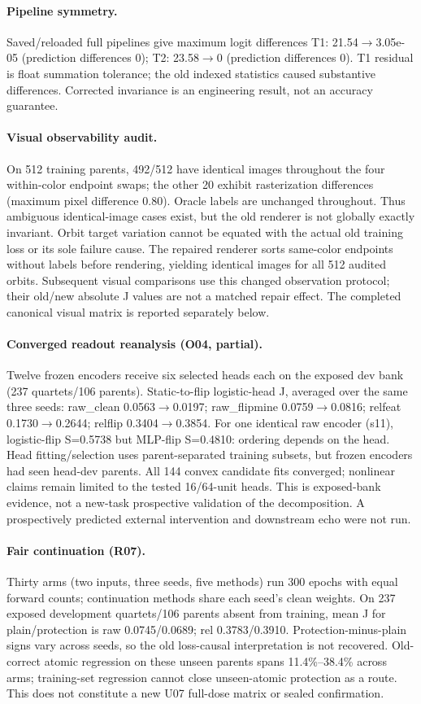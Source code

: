 \paragraph{Pipeline symmetry.} Saved/reloaded full pipelines give maximum logit differences T1: 21.54$\to$3.05e-05 (prediction differences 0); T2: 23.58$\to$0 (prediction differences 0). T1 residual is float summation tolerance; the old indexed statistics caused substantive differences. Corrected invariance is an engineering result, not an accuracy guarantee.
\paragraph{Visual observability audit.} On 512 training parents, 492/512 have identical images throughout the four within-color endpoint swaps; the other 20 exhibit rasterization differences (maximum pixel difference 0.80). Oracle labels are unchanged throughout. Thus ambiguous identical-image cases exist, but the old renderer is not globally exactly invariant. Orbit target variation cannot be equated with the actual old training loss or its sole failure cause. The repaired renderer sorts same-color endpoints without labels before rendering, yielding identical images for all 512 audited orbits. Subsequent visual comparisons use this changed observation protocol; their old/new absolute J values are not a matched repair effect. The completed canonical visual matrix is reported separately below.
\paragraph{Converged readout reanalysis (O04, partial).} Twelve frozen encoders receive six selected heads each on the exposed dev bank (237 quartets/106 parents). Static-to-flip logistic-head J, averaged over the same three seeds: raw\_clean 0.0563$\to$0.0197; raw\_flipmine 0.0759$\to$0.0816; relfeat 0.1730$\to$0.2644; relflip 0.3404$\to$0.3854. For one identical raw encoder (s11), logistic-flip S=0.5738 but MLP-flip S=0.4810: ordering depends on the head. Head fitting/selection uses parent-separated training subsets, but frozen encoders had seen head-dev parents. All 144 convex candidate fits converged; nonlinear claims remain limited to the tested 16/64-unit heads. This is exposed-bank evidence, not a new-task prospective validation of the decomposition. A prospectively predicted external intervention and downstream echo were not run.
\paragraph{Fair continuation (R07).} Thirty arms (two inputs, three seeds, five methods) run 300 epochs with equal forward counts; continuation methods share each seed's clean weights. On 237 exposed development quartets/106 parents absent from training, mean J for plain/protection is raw 0.0745/0.0689; rel 0.3783/0.3910. Protection-minus-plain signs vary across seeds, so the old loss-causal interpretation is not recovered. Old-correct atomic regression on these unseen parents spans 11.4\%--38.4\% across arms; training-set regression cannot close unseen-atomic protection as a route. This does not constitute a new U07 full-dose matrix or sealed confirmation.

